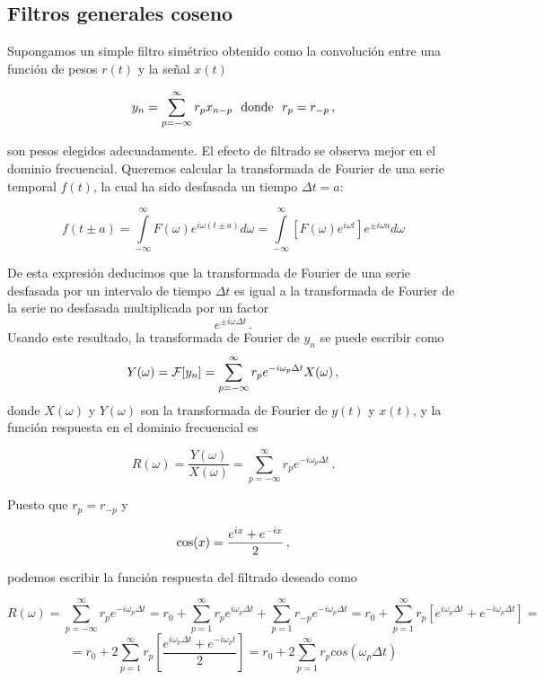 \documentclass[
]{agujournal2019}
\begin{document}
\hypertarget{filtros-generales-coseno}{%
\subsection{Filtros generales coseno}\label{filtros-generales-coseno}}

Supongamos un simple filtro simétrico obtenido como la convolución entre
una función de pesos \(r(t)\) y la señal \(x(t)\)

\[y_n=\sum\limits^{\infty}_{p=-\infty} r_p x_{n-p}\,\,\,\,{\rm donde}\,\,\,\,r_p=r_{-p}\,,\]

son pesos elegidos adecuadamente. El efecto de filtrado se observa mejor
en el dominio frecuencial. Queremos calcular la transformada de Fourier
de una serie temporal \(f(t)\), la cual ha sido desfasada un tiempo
\(\Delta t = a\):

\[f(t\pm a)=\int\limits^{\infty}_{-\infty} F(\omega)e^{i\omega (t\pm a)} d{\omega}=
\int\limits^{\infty}_{-\infty}  \left[F(\omega) e^{i \omega t}\right]e^{\pm i \omega a} d{\omega}\]

De esta expresión deducimos que la transformada de Fourier de una serie
desfasada por un intervalo de tiempo \(\Delta t\) es igual a la
transformada de Fourier de la serie no desfasada multiplicada por un
factor \[e^{\pm i\omega \Delta t}\,.\] Usando este resultado, la
transformada de Fourier de \(y_n\) se puede escribir como
\[Y(\omega)={\cal F}[y_n]=\sum\limits^{\infty}_{p=-\infty} r_p e^{-i\omega_p \Delta t} X(\omega)\,,\]
donde \(X(\omega)\) y \(Y(\omega)\) son la transformada de Fourier de
\(y(t)\) y \(x(t)\), y la función respuesta en el dominio frecuencial es

\[R(\omega)=\frac{Y(\omega)}{X(\omega)}=\sum\limits^{\infty}_{p=-\infty} r_p e^{-i\omega_p \Delta t}\,.\]

Puesto que \(r_p=r_{-p}\) y

\[{\rm cos}(x)=\frac{e^{ix} + e^{-ix}}{2}\,,\]

podemos escribir la función respuesta del filtrado deseado como

\[R(\omega)=\sum\limits^{\infty}_{p=-\infty} r_p e^{-i\omega_p \Delta t}=
r_0 + \sum\limits^{\infty}_{p=1} r_p e^{i\omega_p \Delta t}
+ \sum\limits^{\infty}_{p=1} r_{-p} e^{-i\omega_p \Delta t} =
r_0 + \sum\limits^{\infty}_{p=1} r_p \left[ e^{i\omega_p \Delta t} + e^{-i\omega_p \Delta t}\right]=
\]
\[=r_0 + 2\sum\limits^{\infty}_{p=1} r_p \left[ \frac{e^{i\omega_p \Delta t} + e^{-i\omega_p t}}{2}\right]=
r_0 + 2\sum\limits^{\infty}_{p=1}r_p cos(\omega_p \Delta t)\]
\end{document}

